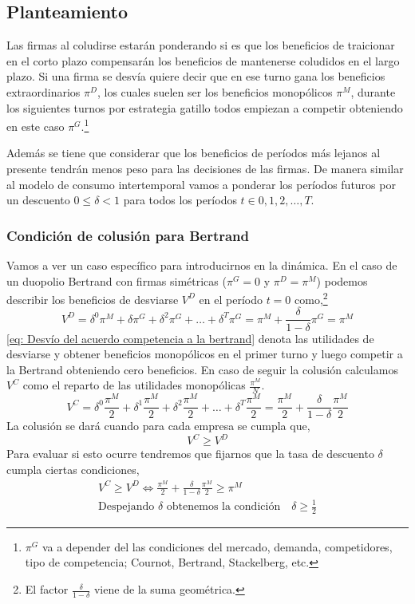 \subsection*{Planteamiento}

Las firmas al coludirse estarán ponderando si es que los beneficios de traicionar en el corto plazo compensarán los beneficios de mantenerse coludidos en el largo plazo. Si una firma se desvía quiere decir que en ese turno gana los beneficios extraordinarios $\pi^D$, los cuales suelen ser los beneficios monopólicos $\pi^M$, durante los siguientes turnos por estrategia gatillo todos empiezan a competir obteniendo en este caso $\pi^G$.\footnote{$\pi^G$ va a depender del las condiciones del mercado, demanda, competidores, tipo de competencia; Cournot, Bertrand, Stackelberg, etc.}

Además se tiene que considerar que los beneficios de períodos más lejanos al presente tendrán menos peso para las decisiones de las firmas. De manera similar al modelo de consumo intertemporal vamos a ponderar los períodos futuros por un descuento $0 \leq \delta < 1$ para todos los períodos $t \in 0,1,2,\ldots,T$.

\subsubsection*{Condición de colusión para Bertrand}

Vamos a ver un caso específico para introducirnos en la dinámica. En el caso de un duopolio Bertrand con firmas simétricas ($\pi^G=0$ y $\pi^D = \pi^M$) podemos describir los beneficios de desviarse $V^D$ en el período $t=0$ como,\footnote{El factor $\frac{\delta}{1-\delta}$ viene de la suma geométrica.}
\begin{equation}
    V^D = \delta^0 \pi^M + \delta \pi^G + \delta^2 \pi^G+ \ldots + \delta^T \pi^G= \pi^M + \frac{\delta}{1-\delta} \pi^G = \pi^M \label{eq: Desvío del acuerdo competencia a la bertrand}
\end{equation}
\ref{eq: Desvío del acuerdo competencia a la bertrand} denota las utilidades de desviarse y obtener beneficios monopólicos en el primer turno y luego competir a la Bertrand obteniendo cero beneficios. En caso de seguir la colusión calculamos $V^C$ como el reparto de las utilidades monopólicas $\frac{\pi^M}{N}$. 
\begin{equation}
    V^C = \delta^0 \frac{\pi^M}{2} + \delta ^1 \frac{\pi^M}{2} + \delta ^2 \frac{\pi^M}{2} +\ldots + \delta^T \frac{\pi^M}{2} = \frac{\pi^M}{2} + \frac{\delta}{1-\delta} \frac{\pi^M}{2}
\end{equation}
La colusión se dará cuando para cada empresa se cumpla que, 
\begin{equation}
    V^C \geq V^D
\end{equation}
Para evaluar si esto ocurre tendremos que fijarnos que la tasa de descuento $\delta$ cumpla ciertas condiciones,
\begin{align*}
    V^C \geq V^D \Longleftrightarrow \frac{\pi^M}{2} + \frac{\delta}{1-\delta} \frac{\pi^M}{2} \geq \pi^M \\
    \text{Despejando $\delta$ obtenemos la condición} \quad \delta \geq \frac{1}{2}
\end{align*}

